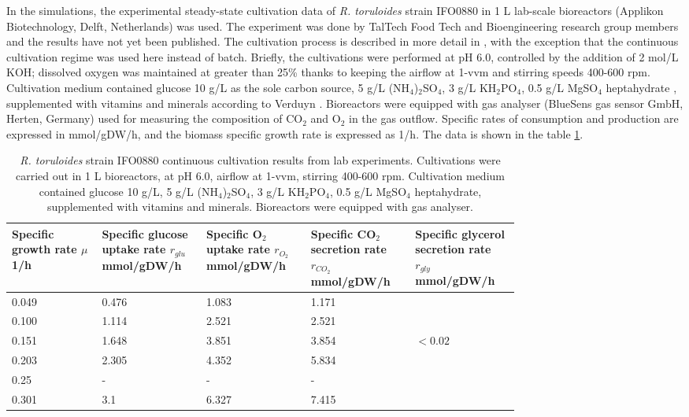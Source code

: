 In the simulations, the experimental steady-state cultivation data of \textit{R. toruloides} strain IFO0880 in 1 L lab-scale bioreactors (Applikon Biotechnology, Delft, Netherlands) was used.
The experiment was done by TalTech Food Tech and Bioengineering research group members and the results have not yet been published. The cultivation process is described in more detail in \cite{Pinheiro2020}, with the exception that the continuous cultivation regime was used here instead of batch. Briefly, the cultivations were performed at pH 6.0, controlled by the addition of 2 \unit{mol/L} KOH; dissolved oxygen was maintained at greater than 25\% thanks to keeping the airflow at 1-\unit{vvm} and stirring speeds 400-600 \unit{rpm}. Cultivation medium contained glucose 10 \unit{g/L} as the sole carbon source, 5 \unit{g/L} (NH$_4$)$_2$SO$_4$, 3 \unit{g/L} KH$_2$PO$_4$, 0.5 \unit{g/L} MgSO$_4$ heptahydrate \cite{Lahtvee2017}, supplemented with vitamins and minerals according to Verduyn \cite{Verduyn1992}. Bioreactors were equipped with gas analyser (BlueSens gas sensor GmbH, Herten, Germany) used for measuring the composition of CO$_2$ and O$_2$ in the gas outflow.
Specific rates of consumption and production are expressed in \unit{mmol/gDW/h}, and the biomass specific growth rate is expressed as \unit{1/h}. The data is shown in the table \ref{table:LabData}.
\begin{table}[H]
    \centering
    \caption{\textit{R. toruloides} strain IFO0880 continuous cultivation results from lab experiments. Cultivations were carried out in 1 L bioreactors, at pH 6.0, airflow at 1-\unit{vvm}, stirring 400-600 \unit{rpm}. Cultivation medium contained glucose 10 \unit{g/L}, 5 \unit{g/L} (NH$_4$)$_2$SO$_4$, 3 \unit{g/L} KH$_2$PO$_4$, 0.5 \unit{g/L} MgSO$_4$ heptahydrate, supplemented with vitamins and minerals. Bioreactors were equipped with gas analyser.}
    \begin{tabular}{p{0.15\linewidth}|p{0.15\linewidth}|p{0.15\linewidth}|p{0.15\linewidth}|p{0.15\linewidth}}
            \textbf{Specific growth rate $\mu$ \unit{1/h}} & \textbf{Specific glucose uptake rate $r_{glu}$ \unit{mmol/gDW/h}} & \textbf{Specific O$_2$ uptake rate $r_{O_2}$ \unit{mmol/gDW/h}} & \textbf{Specific CO$_2$ secretion rate $r_{CO_2}$ \unit{mmol/gDW/h}} & \textbf{Specific glycerol secretion rate $r_{gly}$ \unit{mmol/gDW/h}} \\ \hline
            0.049 & 0.476 & 1.083 & 1.171 &  ~\\ 
            0.100 & 1.114 & 2.521 & 2.521 &  ~ \\ 
            0.151 & 1.648 & 3.851 & 3.854 &  $<0.02$\\ 
            0.203 & 2.305 & 4.352 & 5.834 &  ~ \\ 
            0.25 & - & - & - & ~  \\ 
            0.301 & 3.1 & 6.327 & 7.415 &  ~ \\ 
        \end{tabular}
    \label{table:LabData}
\end{table}

